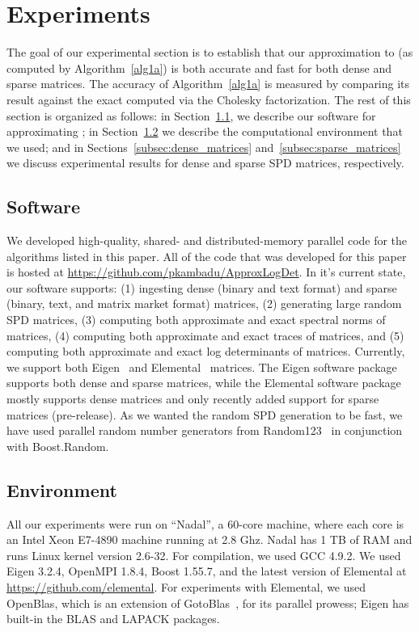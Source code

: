 \section{Experiments}\label{sxn:exps}

The goal of our experimental section is to establish that our approximation
to  (as computed by Algorithm~\ref{alg1a}) is both accurate and fast for both
dense and sparse matrices.
The accuracy of Algorithm~\ref{alg1a} is measured by comparing its result
against the exact  computed via the Cholesky factorization.
The rest of this section is organized as follows:
in Section~\ref{subsec:software}, we describe our software for approximating
; in Section~\ref{subsec:environment} we describe the computational environment that we used; and
in Sections~\ref{subsec:dense_matrices} and~\ref{subsec:sparse_matrices} we
discuss experimental results for dense and sparse SPD matrices, respectively.

\subsection{Software}
\label{subsec:software}
We developed high-quality, shared- and distributed-memory parallel \Cpp{}
code for the algorithms listed in this paper.
All of the code that was developed for this paper is hosted at \url{https://github.com/pkambadu/ApproxLogDet}.
In it's current state, our software supports:
(1) ingesting dense (binary and text format) and sparse (binary,
text, and matrix market format) matrices,
(2) generating large random SPD matrices,
(3) computing both approximate and exact spectral norms of matrices,
(4) computing both approximate and exact traces of matrices, and
(5) computing both approximate and exact log determinants of matrices.
Currently, we support both Eigen~\cite{eigenweb} and
Elemental~\cite{poulson2013elemental} matrices.
The Eigen software package supports both dense and sparse matrices, while the Elemental software package mostly
supports dense matrices and only recently added support for sparse matrices
(pre-release).
As we wanted the random SPD generation to be fast, we have used parallel
random number generators from Random123~\cite{salmon2011parallel} in
conjunction with Boost.Random.


\subsection{Environment}
\label{subsec:environment}
All our experiments were run on ``Nadal'', a 60-core machine, where each
core is an Intel\textregistered{} Xeon\textregistered{} E7-4890 machine running
at 2.8 Ghz.
Nadal has 1 TB of RAM and runs Linux kernel version 2.6-32.
For compilation, we used GCC 4.9.2.
We used Eigen 3.2.4, OpenMPI 1.8.4, Boost 1.55.7, and the latest version of
Elemental at {\small\url{https://github.com/elemental}}.
For experiments with Elemental, we used OpenBlas, which is an extension of
GotoBlas~\cite{goto2008high}, for its parallel prowess; Eigen has built-in the
BLAS and LAPACK packages.


